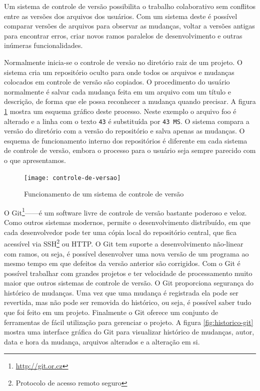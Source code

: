 Um sistema de controle de versão possibilita o trabalho colaborativo
sem conflitos entre as versões dos arquivos dos usuários. Com um
sistema deste é possível comparar versões de arquivos para observar as
mudanças, voltar a versões antigas para encontrar erros, criar novos
ramos paralelos de desenvolvimento e outras inúmeras funcionalidades.

Normalmente inicia-se o controle de versão no diretório raiz de um
projeto. O sistema cria um repositório oculto para onde todos os
arquivos e mudanças colocados em controle de versão são copiados. O
procedimento do usuário normalmente é salvar cada mudança feita em um
arquivo com um título e descrição, de forma que ele possa reconhecer a
mudança quando precisar. A figura \ref{fig:controle-de-versao} mostra
um esquema gráfico deste processo. Neste exemplo o arquivo foo é
alterado e a linha com o texto \verb!43! é substituída por
\verb!43 MS!. O sistema compara a versão do diretório com a versão do
repositório e salva apenas as mudanças. O esquema de funcionamento
interno dos repositórios é diferente em cada sistema de controle de
versão, embora o processo para o usuário seja sempre parecido com o
que apresentamos.

\begin{figure}
  \centering
  \texttt{[image: controle-de-versao]}
  \caption{Funcionamento de um sistema de controle de versão}
  \label{fig:controle-de-versao}
\end{figure}

O Git\footnote{\url{http://git.or.cz}}------é um software livre de controle de versão bastante
poderoso e veloz. Como outros sistemas modernos, permite o
desenvolvimento distribuído, em que cada desenvolvedor pode ter uma
cópia local do repositório central, que fica acessível via
SSH\footnote{Protocolo de acesso remoto seguro} ou HTTP. O Git tem
suporte a desenvolvimento não-linear com ramos, ou seja, é possível
desenvolver uma nova versão de um programa ao mesmo tempo em que
defeitos da versão anterior são corrigidos. Com o Git é possível
trabalhar com grandes projetos e ter velocidade de processamento muito
maior que outros sistemas de controle de versão. O Git proporciona
segurança do histórico de mudanças. Uma vez que uma mudança é
registrada ela pode ser revertida, mas não pode ser removida do
histórico, ou seja, é possível saber tudo que foi feito em um
projeto. Finalmente o Git oferece um conjunto de ferramentas de fácil
utilização para gerenciar o projeto. A figura \ref{fig:historico-git}
mostra uma interface gráfica do Git para visualizar histórico de
mudanças, autor, data e hora da mudança, arquivos alterados e a
alteração em si.

